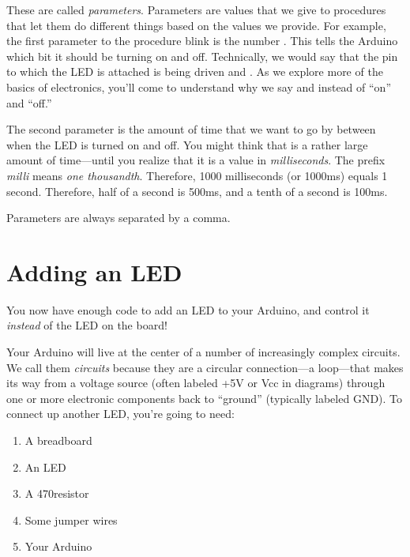 These are called {\em parameters}. Parameters are values that we give to procedures that let them do different things based on the values we provide. For example, the first parameter to the procedure {\procname blink} is the number {}. This tells the Arduino which bit it should be turning on and off. Technically, we would say that the pin to which the LED is attached is being driven \HIGH and \LOW. As we explore more of the basics of electronics, you'll come to understand why we say \HIGH and \LOW instead of ``on'' and ``off.''

The second parameter is the amount of time that we want to go by between when the LED is turned on and off. You might think that {} is a rather large amount of time---until you realize that it is a value in {\em milliseconds}. The prefix {\em milli} means {\em one thousandth}. Therefore, 1000 milliseconds (or 1000ms) equals 1 second. Therefore, half of a second is 500ms, and a tenth of a second is 100ms. 

Parameters are always separated by a comma.

\section{Adding an LED}
You now have enough \plumbing code to add an LED to your Arduino, and control it {\em instead} of the LED on the board!


Your Arduino will live at the center of a number of increasingly complex circuits. We call them {\em circuits} because they are a circular connection---a loop---that makes its way from a voltage source (often labeled {\code +5V} or {\code Vcc} in diagrams) through one or more electronic components back to ``ground'' (typically labeled {\code GND}). To connect up another LED, you're going to need:

\begin{enumerate}
	\item A breadboard
	\item An LED
	\item A 470\ohm resistor
	\item Some jumper wires
	\item Your Arduino
\end{enumerate}

